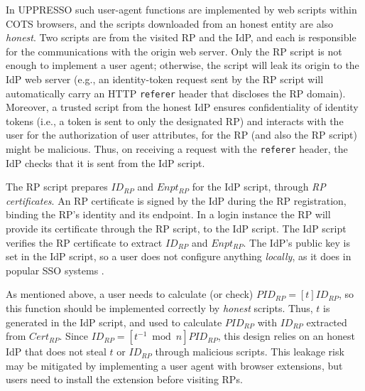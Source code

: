 In UPPRESSO such user-agent functions are implemented by web scripts within COTS browsers,
and the scripts downloaded from an honest entity are also \emph{honest}.
Two scripts are from the visited RP and the IdP, %
    and each is responsible for the communications with the origin web server.
Only the RP script is not enough to implement a user agent;
    otherwise, the script will leak its origin to the IdP web server
    (e.g.,
    an identity-token request sent by the RP script will
automatically carry an HTTP \verb+referer+ header that discloses the RP domain).
Moreover, a trusted script from the honest IdP
ensures confidentiality of identity tokens (i.e., a token is sent to only the designated RP)
and interacts with the user for the authorization of user attributes,
    for the RP (and also the RP script) might be malicious.
Thus, on receiving a request with the \verb+referer+ header,
    the IdP checks that it is sent from the IdP script.

The RP script prepares $ID_{RP}$ and $Enpt_{RP}$ for the IdP script, through \emph{RP certificates}.
An RP certificate is signed by the IdP during the RP registration,
     binding the RP's identity and its endpoint. %
In a login instance
    the RP will provide its certificate through the RP script, to the IdP script.
The IdP script %
    verifies the RP certificate to extract $ID_{RP}$ and $Enpt_{RP}$.
The IdP's public key is set in the IdP script, so
 a user does not configure anything \emph{locally},
    as it does in popular SSO systems \cite{OpenIDConnect, rfc6749, SAML,SAMLIdentifier}.


As mentioned above,
    a user needs to calculate (or check) $PID_{RP} = [t]ID_{RP}$,
    so this function should be implemented correctly by \emph{honest} scripts.
Thus, $t$ is generated in the IdP script,
    and used to calculate $PID_{RP}$ with $ID_{RP}$ extracted from $Cert_{RP}$.
Since $ID_{RP} = [t^{-1}\bmod n]PID_{RP}$,
    this design relies on an honest IdP that does not steal $t$ or $ID_{RP}$ through malicious scripts.
This leakage risk may be mitigated %
    by implementing a user agent with browser extensions,
but users need to install the extension before visiting RPs.

